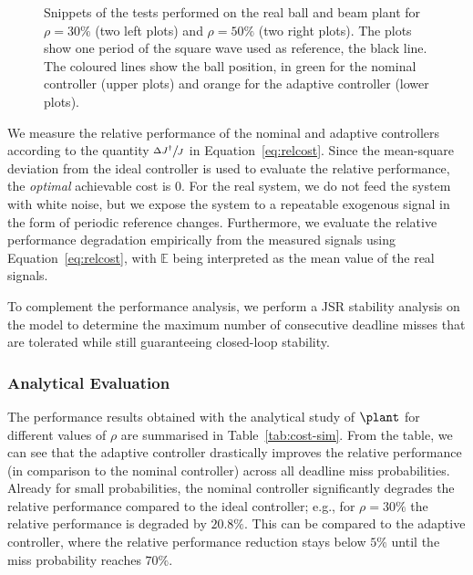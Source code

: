 \begin{figure*}
    \centering
    
    \vspace{-3mm}
    \caption{Snippets of the tests performed on the real ball and beam plant for $\rho=30\%$ (two left plots) and $\rho=50\%$ (two right plots).
        The plots show one period of the square wave used as reference, the black line.
        The coloured lines show the ball position, in green for the nominal controller (upper plots) and orange for the adaptive controller (lower plots).}
    \label{fig:real-plant}
\end{figure*}

We measure the relative performance of the nominal and adaptive controllers according to the quantity $\sfrac{\Delta J^\dagger}{J}$ in Equation~\eqref{eq:relcost}.
Since the mean-square deviation from the ideal controller is used to evaluate the relative performance, the \emph{optimal} achievable cost is $0$.
For the real system, we do not feed the system with white noise, but we expose the system to a repeatable exogenous signal in the form of periodic reference changes. 
Furthermore, we evaluate the relative performance degradation empirically from the measured signals using Equation~\eqref{eq:relcost}, with $\mathbb{E}$ being interpreted as the mean value of the real signals.

To complement the performance analysis, we perform a JSR stability analysis on the model to determine the maximum number of consecutive deadline misses that are tolerated while still guaranteeing closed-loop stability.

\subsubsection*{Analytical Evaluation}
The performance results obtained with the analytical study of $\plant$ for different values of $\rho$ are summarised in Table~\ref{tab:cost-sim}.
From the table, we can see that the adaptive controller drastically improves the relative performance (in comparison to the nominal controller) across all deadline miss probabilities.
Already for small probabilities, the nominal controller significantly degrades the relative performance compared to the ideal controller; e.g., for $\rho = 30\%$ the relative performance is degraded by $20.8\%$. This can be compared to the  adaptive controller, where the relative performance reduction stays below $5\%$ until the miss probability reaches $70\%$.

